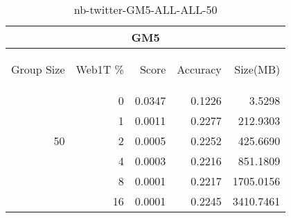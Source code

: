 \begin{center}
\begin{table}[htbp] 
 \begin{center}
\begin{tabular}{ | r | r | r | r | r |}
\hline
\multicolumn{5}{|c|}{GM5}\\
\hline
\begin{sideways}Group Size\end{sideways} & \begin{sideways}Web1T \%\end{sideways} & \begin{sideways}Score\end{sideways} & \begin{sideways}Accuracy\end{sideways} & \begin{sideways}Size(MB)\end{sideways}\\
\hline
\multirow{5}{*}{50}
 & 0 & 0.0347 & 0.1226 & 3.5298\\ \cline{2-5}
 & 1 & 0.0011 & 0.2277 & 212.9303\\ \cline{2-5}
 & 2 & 0.0005 & 0.2252 & 425.6690\\ \cline{2-5}
 & 4 & 0.0003 & 0.2216 & 851.1809\\ \cline{2-5}
 & 8 & 0.0001 & 0.2217 & 1705.0156\\ \cline{2-5}
 & 16 & 0.0001 & 0.2245 & 3410.7461\\ \cline{2-5}
\hline
\end{tabular}
\caption{nb-twitter-GM5-ALL-ALL-50}
\label{table:nb-twitter-GM5-ALL-ALL-50}
\end{center}
 \end{table}
\end{center}

